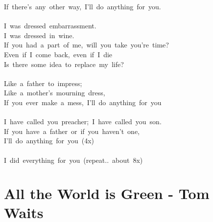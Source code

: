 \documentclass[]{book}
\let\stdsection\section
\renewcommand\section{\clearpage\stdsection}
\begin{document}
If~there's~any~other~way,~I'll~do~anything~for~you.\\
~\\
I~was~dressed~embarrassment.~\\
I~was~dressed~in~wine.~\\
If~you~had~a~part~of~me,~will~you~take~you're~time?~\\
Even~if~I~come~back,~even~if~I~die~\\
Is~there~some~idea~to~replace~my~life?~\\
~\\
Like~a~father~to~impress;~\\
Like~a~mother's~mourning~dress,~\\
If~you~ever~make~a~mess,~I'll~do~anything~for~you~\\
~\\
I~have~called~you~preacher;~I~have~called~you~son.~\\
If~you~have~a~father~or~if~you~haven't~one,~\\
I'll~do~anything~for~you~(4x)\\
~\\
I~did~everything~for~you~(repeat..~about~8x)\\

\hypertarget{all-the-world-is-green---tom-waits}{%
\section{All the World is Green - Tom Waits}\label{all-the-world-is-green---tom-waits}}
\end{document}
